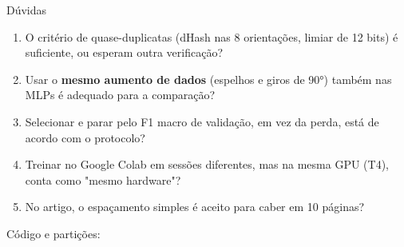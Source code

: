 \documentclass[aspectratio=169,10pt,t]{beamer}
\begin{document}
\begin{frame}{Dúvidas}
\begin{enumerate}
\item O critério de quase-duplicatas (dHash nas 8 orientações, limiar de 12 bits) é suficiente, ou esperam outra verificação?
\item Usar o \textbf{mesmo aumento de dados} (espelhos e giros de 90°) também nas MLPs é adequado para a comparação?
\item Selecionar e parar pelo F1 macro de validação, em vez da perda, está de acordo com o protocolo?
\item Treinar no Google Colab em sessões diferentes, mas na mesma GPU (T4), conta como "mesmo hardware"?
\item No artigo, o espaçamento simples é aceito para caber em 10 páginas?
\end{enumerate}
\vfill
\centering\small Código e partições: \repo
\end{frame}
\end{document}
